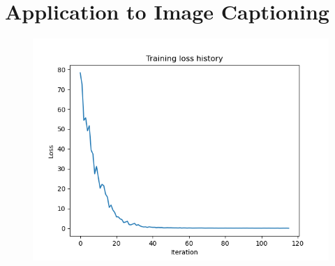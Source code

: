 \documentclass{article}
\begin{document}
\newpage

\section{Application to Image Captioning}

\begin{figure}[htbp]
    \centering
    \includegraphics[width=.5\textwidth]{ic_loss.png}
\end{figure}
\end{document}
